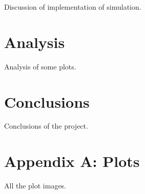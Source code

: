 \documentclass[12pt]{article}
\begin{document}
    Discussion of implementation of simulation.

    \section{Analysis}

    Analysis of some plots.

    \section{Conclusions}

    Conclusions of the project.

    \section{Appendix A: Plots}

    All the plot images.

    \section{}
\end{document}
